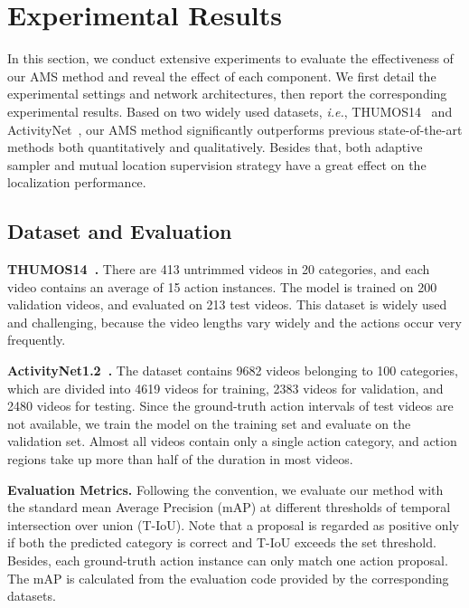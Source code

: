 \documentclass[journal]{IEEEtran}
\begin{document}
\section{Experimental Results}
\label{section:experiments}
In this section, we conduct extensive experiments to evaluate the effectiveness of our AMS method and reveal the effect of each component. We first detail the experimental settings and network architectures, then report the corresponding experimental results. Based on two widely used datasets, \emph{i.e.}, THUMOS14~\cite{jiang2014thumos} and ActivityNet~\cite{caba2015activitynet}, our AMS method significantly outperforms previous state-of-the-art methods both quantitatively and qualitatively. Besides that, both adaptive sampler and mutual location supervision strategy have a great effect on the localization performance.



\subsection{Dataset and Evaluation}
\noindent \textbf{THUMOS14~\cite{jiang2014thumos}.}
There are 413 untrimmed videos in 20 categories, and each video contains an average of 15 action instances. The model is trained on 200 validation videos, and evaluated on 213 test videos. This dataset is widely used and challenging, because the video lengths vary widely and the actions occur very frequently.


\noindent \textbf{ActivityNet1.2~\cite{caba2015activitynet}.}
The dataset contains 9682 videos belonging to 100 categories, which are divided into 4619 videos for training, 2383 videos for validation, and 2480 videos for testing. Since the ground-truth action intervals of test videos are not available, we train the model on the training set and evaluate on the validation set. Almost all videos contain only a single action category, and action regions take up more than half of the duration in most videos.


\noindent \textbf{Evaluation Metrics.}
Following the convention, we evaluate our method with the standard mean Average Precision (mAP) at different thresholds of temporal intersection over union (T-IoU). Note that a proposal is regarded as positive only if both the predicted category is correct and T-IoU exceeds the set threshold. Besides, each ground-truth action instance can only match one action proposal. The mAP is calculated from the evaluation code provided by the corresponding datasets.
\end{document}
